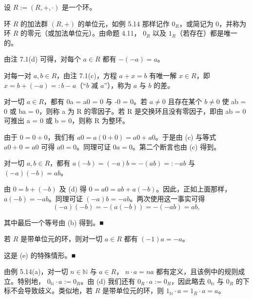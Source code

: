 \begin{remark}

设  $ R := (R, +, \cdot) $ 是一个环。

\begin{items}
\item

环  $ R $ 的加法群  $ (R, +) $ 的单位元，如例 5.14 那样记作  $ 0_R $，或简记为 0，并称为环  $ R $ 的零元（或加法单位元）。由命题 4.11， $ 0_R $ 以及  $ 1_R $（若存在）都是唯一的。

\item

由注 7.1(d) 可得，对每个  $ a \in R $ 都有  $ -(-a) = a $。

\item

对每一对 $a, b \in R$，由注 7.1(c)，方程 $a + x = b$ 有唯一解 $x \in R$，即 $x = b + (-a) =: b - a$（“$b$ 减 $a$”），称为 $a$ 与 $b$ 的差。

\item

对一切  $ a \in R $，都有 0a = a0 = 0 与 -0 = 0。若  $ a \neq 0 $ 且存在某个  $ b \neq 0 $ 使 ab = 0 或 ba = 0，则称 a 为 R 的零因子。若 R 是交换环且没有零因子，即由 ab = 0 可推出 a = 0 或 b = 0，则称 R 为整环。

\proofhead
由于 $0=0+0$，我们有 $a0=a(0+0)=a0+a0$。于是由 (c) 与等式 $a0+0=a0$ 可得 $a0=0$。同理可证 $0a=0$。第二个断言也由 (c) 得到。
\item

对一切 $a, b \in R$，都有 $a(-b) = (-a)b = -(ab) =: -ab$ 与 $(-a)(-b) = ab$。

\proofhead
由 $0 = b + (-b)$ 及 (d) 得 $0 = a0 = ab + a(-b)$。因此，正如上面那样，$a(-b) = -ab$。同理可证 $(-a)b = -ab$。两次使用这一事实可得
\[
(-a)(-b)=-\left(a(-b)\right)=-(-ab)=ab,
\]

其中最后一个等号由 (b) 得到。■

\item

若 $R$ 是带单位元的环，则对一切 $a \in R$ 都有 $(-1)a = -a$。

\proofhead
这是 (e) 的特殊情形。■
\item

由例 5.14(a)，对一切  $ n \in \mathbb{N} $ 与  $ a \in R $， $ n \cdot a = na $ 都有定义，且该例中的规则成立。特别地， $ 0_{\mathbb{N}} \cdot a := 0_R $。由 (d) 我们还有  $ 0_R \cdot a := 0_R $，因此略去  $ 0_{\mathbb{N}} $ 与  $ 0_R $ 的下标不会导致歧义。类似地，若  $ R $ 是带单位元的环，则  $ 1_{\mathbb{N}} \cdot a = 1_R \cdot a = a $。

\end{items}

\end{remark}

